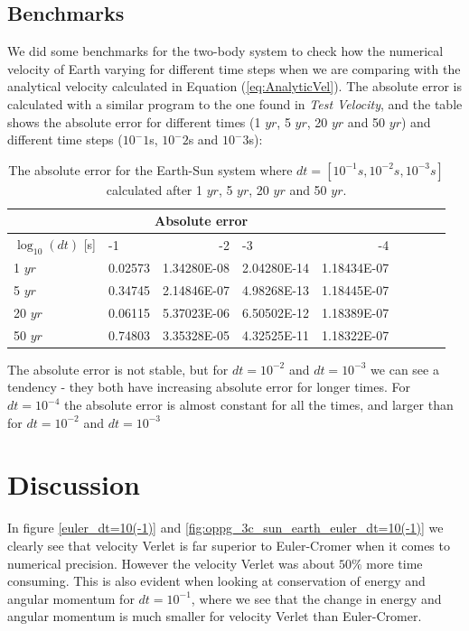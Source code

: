 \documentclass[norsk,a4paper,12pt]{article}
\begin{document}
{\subsection{Benchmarks}
We did some benchmarks for the two-body system to check how the numerical velocity of Earth varying for different time steps when we are comparing with the analytical velocity calculated in Equation (\ref{eq:AnalyticVel}). The absolute error is calculated with a similar program to the one found in \textit{Test Velocity}, and the table shows the absolute error for different times (1 $yr$, 5 $yr$, 20 $yr$ and 50 $yr$) and different time steps ($10^-1$s, $10^-2$s and $10^-3$s):
\begin{table}[H]
\centering
\caption{The absolute error for the Earth-Sun system where $dt=[10^{-1}s,10^{-2}s,10^{-3}s]$ calculated after 1 $yr$, 5 $yr$, 20 $yr$ and 50 $yr$.}
\label{tab:Benchmark}
\begin{tabularx}{\textwidth}{lXrXrXrXr}
\toprule
\multicolumn{5}{c}{Absolute error}\\
\midrule
$\log_{10}(dt)$ [s]        & -1 & -2 & -3 & -4 \\
\midrule
1 $yr$      & 0.02573  & 1.34280E-08  & 2.04280E-14 & 1.18434E-07 \\
5 $yr$      & 0.34745  & 2.14846E-07  & 4.98268E-13 & 1.18445E-07 \\
20 $yr$     & 0.06115  & 5.37023E-06  & 6.50502E-12 & 1.18389E-07 \\
50 $yr$     & 0.74803  & 3.35328E-05  & 4.32525E-11 & 1.18322E-07 \\
\bottomrule
\end{tabularx}
\end{table}
The absolute error is not stable, but for $dt=10^{-2}$ and $dt=10^{-3}$ we can see a tendency - they both have increasing absolute error for longer times. For $dt=10^{-4}$ the absolute error is almost constant for all the times, and larger than for $dt=10^{-2}$ and $dt=10^{-3}$
\section{Discussion}
In figure \ref{euler_dt=10(-1)} and \ref{fig:oppg_3c_sun_earth_euler_dt=10(-1)} we clearly see that velocity Verlet is far superior to Euler-Cromer when it comes to numerical precision. However the velocity Verlet was about $50\%$ more time consuming. This is also evident when looking at conservation of energy and angular momentum for $dt = 10^{-1}$, where we see that the change in energy and angular momentum is much smaller for velocity Verlet than Euler-Cromer.

}
\end{document}
